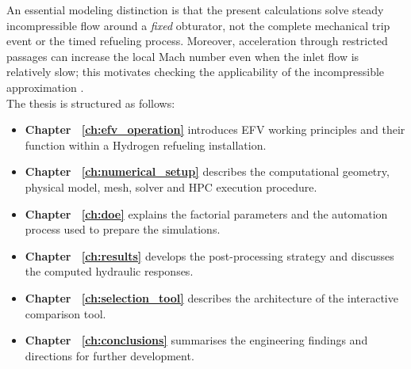 An essential modeling distinction is that the present calculations solve steady incompressible flow around a \emph{fixed} obturator, not the complete mechanical trip event or the timed refueling process. Moreover, acceleration through restricted passages can increase the local Mach number even when the inlet flow is relatively slow; this motivates checking the applicability of the incompressible approximation \cite{anderson2017}.\\

The thesis is structured as follows:
\begin{itemize}
    \item \textbf{Chapter ~\ref{ch:efv_operation}} introduces EFV working principles and their function within a Hydrogen refueling installation. %
    \item \textbf{Chapter ~\ref{ch:numerical_setup}} describes the computational geometry, physical model, mesh, solver and HPC execution procedure. %
    \item \textbf{Chapter ~\ref{ch:doe}} explains the factorial parameters and the automation process used to prepare the simulations. %
    \item \textbf{Chapter ~\ref{ch:results}} develops the post-processing strategy and discusses the computed hydraulic responses.
    \item \textbf{Chapter ~\ref{ch:selection_tool}} describes the architecture of the interactive comparison tool.
    \item \textbf{Chapter ~\ref{ch:conclusions}} summarises the engineering findings and directions for further development.
\end{itemize}